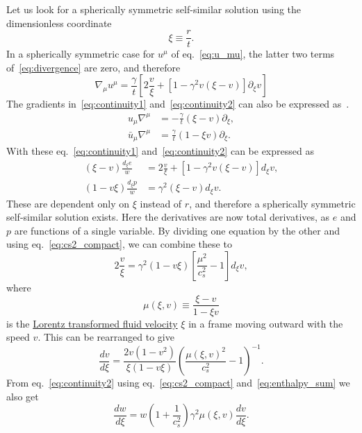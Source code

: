 Let us look for a spherically symmetric self-similar solution using the dimensionless coordinate
\begin{equation}
\xi \equiv \frac{r}{t}.
\end{equation}
In a spherically symmetric case for $u^\mu$ of eq.~\eqref{eq:u_mu},
the latter two terms of~\eqref{eq:divergence} are zero, and therefore
\begin{equation}
\nabla_\mu u^\mu = \frac{\gamma}{t} \left[ 2\frac{v}{\xi} + \left[1 - \gamma^2 v (\xi - v) \right] \partial_\xi v \right]
\end{equation}
The gradients in~\eqref{eq:continuity1} and~\eqref{eq:continuity2} can also be expressed as~\cite[eq. 25]{espinosa_energy_2010}.
\begin{align}
u_\mu \nabla^\mu &= - \frac{\gamma}{t} (\xi - v) \partial_\xi, \\
\bar{u}_\mu \nabla^\mu &= \frac{\gamma}{t} (1 - \xi v) \partial_\xi.
\end{align}
With these eq.~\eqref{eq:continuity1} and~\eqref{eq:continuity2} can be expressed as
\begin{align}
(\xi - v) \frac{d_\xi e}{w} &= 2 \frac{v}{\xi} + \left[ 1 - \gamma^2 v (\xi - v) \right] d_\xi v, \\
(1 - v\xi) \frac{d_\xi p}{w} &= \gamma^2 (\xi - v) d_\xi v.
\end{align}
These are dependent only on $\xi$ instead of $r$,
and therefore a spherically symmetric self-similar solution exists.
Here the derivatives are now total derivatives, as $e$ and $p$ are functions of a single variable.
By dividing one equation by the other and using eq.~\eqref{eq:cs2_compact}, we can combine these to
\begin{equation}
2 \frac{v}{\xi} = \gamma^2 (1 - v\xi) \left[ \frac{\mu^2}{c_s^2} - 1 \right] d_\xi v,
\label{eq:continuity_combined}
\end{equation}
where
\begin{equation}
\mu(\xi,v) \equiv \frac{\xi - v}{1 - \xi v}
\label{eq:mu}
\end{equation}
is the
\href{https://en.wikipedia.org/wiki/Velocity-addition_formula#Standard_configuration}{Lorentz transformed fluid velocity}
$\xi$ in a frame moving outward with the speed $v$.
This can be rearranged to give
\cites[eq. 7.30-7.31]{lecture_notes}[eq. 5]{giese_2021}
\begin{equation}
\frac{dv}{d\xi} = \frac{2v(1-v^2)}{\xi(1-v\xi)} \left( \frac{\mu(\xi,v)^2}{c_s^2} - 1 \right)^{-1}.
\label{eq:hydro_diff1}
\end{equation}
From eq.~\eqref{eq:continuity2} using eq.~\eqref{eq:cs2_compact} and~\eqref{eq:enthalpy_sum} we also get
\begin{equation}
\frac{dw}{d\xi} = w \left( 1 + \frac{1}{c_s^2} \right) \gamma^2 \mu(\xi,v) \frac{dv}{d\xi}.
\label{eq:hydro_diff2}
\end{equation}

